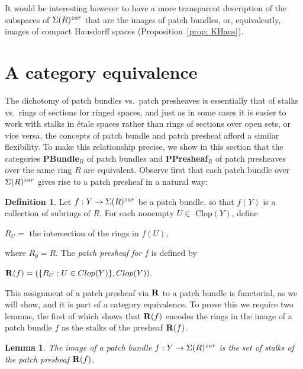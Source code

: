 \documentclass[11pt]{amsart}
\newtheorem{lemma}[theorem]{Lemma}
\theoremstyle{definition}
\newtheorem{definition}[theorem]{Definition}
\begin{document}
It would be interesting however to have a more transparent description of the subspaces of $\Sigma(R)^{\rm zar}$ that are the images of patch bundles, or,  equivalently, images of compact Hausdorff spaces (Proposition~\ref{prop: KHaus}).



\section{A category equivalence}\label{sec: 4 A category equivalence}

The dichotomy of patch bundles vs.~patch presheaves 
is essentially  that of  stalks vs.~rings of sections for ringed spaces, and just as in some cases it is easier to work with stalks in \'{e}tale spaces rather than rings of sections over open sets, or vice versa, the concepts of patch bundle and patch presheaf afford a similar flexibility. To make this relationship precise, we show in this section that the categories {\bf PBundle}$_R$ of patch bundles and {\bf PPresheaf}$_R$ of patch presheaves over the same ring $R$ are equivalent. Observe first that 
each patch bundle over $\Sigma(R)^{\rm zar}$ gives rise to a patch presheaf in a natural way:

\begin{definition}\label{dfn: patch presheaf of a patch bundle} Let $f:Y \rightarrow \Sigma(R)^{\rm zar}$ be a patch bundle, so that $f(Y)$ is a collection of subrings of $R$.  For each nonempty $U \in $ Clop$(Y)$, define 
\begin{center} $R_U = $  the intersection of the rings in $f(U),$  
\end{center}
where $R_\emptyset = R$. The  
 {\it patch presheaf for} $f$ is defined by 
\begin{center}
${\bf R}(f) = \left(
\{R_U:U \in {\rm Clop}(Y)\},  {\rm Clop}(Y)\right)$.
\end{center}
\end{definition}

This assignment of a patch presheaf via ${\bf R}$ to a patch bundle is functorial, as we will show, and it is part of a category equivalence. To prove this we require two lemmas, the first of which shows that ${\bf R}(f)$ encodes the rings in the image of a patch bundle $f$ as the stalks of the presheaf ${\bf R}(f)$.  


\begin{lemma} \label{lem: bundle and stalks}
The image of a patch bundle $f:Y \rightarrow \Sigma(R)^{\rm zar}$  is the set of stalks of the patch presheaf ${\bf R}(f)$.    
\end{lemma} 
\end{document}
